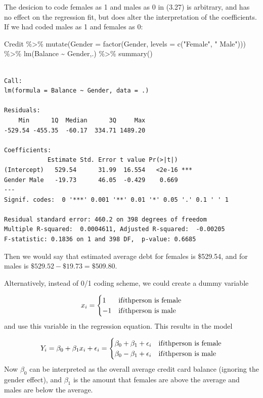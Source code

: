 \documentclass[
  letterpaper,
  DIV=11,
  numbers=noendperiod]{scrreprt}
\newenvironment{Shaded}{\begin{snugshade}}{\end{snugshade}}
\newcommand{\AttributeTok}[1]{\textcolor[rgb]{0.65,0.35,0.00}{#1}}
\newcommand{\FunctionTok}[1]{\textcolor[rgb]{0.02,0.16,0.49}{#1}}
\newcommand{\NormalTok}[1]{\textcolor[rgb]{0.33,0.33,0.33}{#1}}
\newcommand{\SpecialCharTok}[1]{\textcolor[rgb]{0.00,0.46,0.62}{#1}}
\newcommand{\StringTok}[1]{\textcolor[rgb]{0.00,0.50,0.00}{#1}}
\begin{document}
The desicion to code females as 1 and males as 0 in (3.27) is arbitrary,
and has no effect on the regression fit, but does alter the
interpretation of the coefficients. If we had coded males as 1 and
females as 0:

\begin{Shaded}
\begin{Highlighting}[]
\NormalTok{Credit }\SpecialCharTok{\%\textgreater{}\%} 
  \FunctionTok{mutate}\NormalTok{(}\AttributeTok{Gender =} \FunctionTok{factor}\NormalTok{(Gender, }\AttributeTok{levels =} \FunctionTok{c}\NormalTok{(}\StringTok{"Female"}\NormalTok{, }\StringTok{" Male"}\NormalTok{))) }\SpecialCharTok{\%\textgreater{}\%} 
  \FunctionTok{lm}\NormalTok{(Balance }\SpecialCharTok{\textasciitilde{}}\NormalTok{ Gender,.) }\SpecialCharTok{\%\textgreater{}\%} 
  \FunctionTok{summary}\NormalTok{()}
\end{Highlighting}
\end{Shaded}

\begin{verbatim}

Call:
lm(formula = Balance ~ Gender, data = .)

Residuals:
    Min      1Q  Median      3Q     Max 
-529.54 -455.35  -60.17  334.71 1489.20 

Coefficients:
            Estimate Std. Error t value Pr(>|t|)    
(Intercept)   529.54      31.99  16.554   <2e-16 ***
Gender Male   -19.73      46.05  -0.429    0.669    
---
Signif. codes:  0 '***' 0.001 '**' 0.01 '*' 0.05 '.' 0.1 ' ' 1

Residual standard error: 460.2 on 398 degrees of freedom
Multiple R-squared:  0.0004611, Adjusted R-squared:  -0.00205 
F-statistic: 0.1836 on 1 and 398 DF,  p-value: 0.6685
\end{verbatim}

Then we would say that estimated average debt for females is \$529.54,
and for males is \(\$529.52 - \$19.73 = \$509.80\).

Alternatively, instead of 0/1 coding scheme, we could create a dummy
variable

\[
x_i = 
\begin{cases}
1 & \text{if}\space i\text{th}\space \text{person is female} \\
-1 & \text{if}\space i\text{th}\space \text{person is male}
\end{cases}
\] and use this variable in the regression equation. This results in the
model

\[
Y_i = \beta_0 + \beta_1x_i + \epsilon_i = 
\begin{cases}
\beta_0 + \beta_1 + \epsilon_i & \text{if}\space i\text{th}\space \text{person is female} \\
\beta_0 - \beta_1 + \epsilon_i & \text{if}\space i\text{th}\space \text{person is male} 
\end{cases}
\] Now \(\beta_0\) can be interpreted as the overall average credit card
balance (ignoring the gender effect), and \(\beta_1\) is the amount that
females are above the average and males are below the average.
\end{document}
